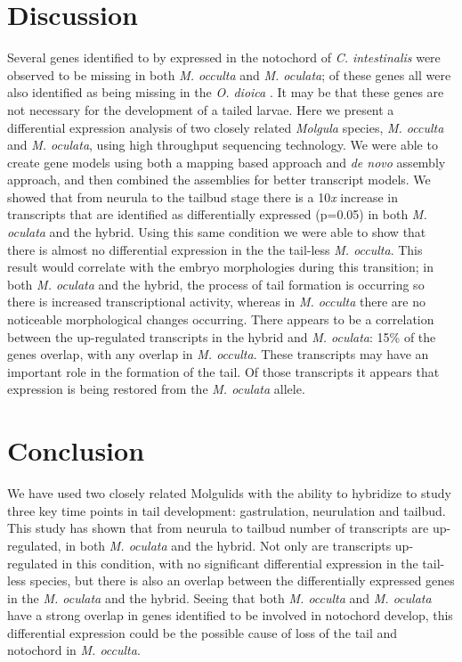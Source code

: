 \section{Discussion}
Several genes identified to by expressed in the notochord of \textit{C. intestinalis} \cite{hotta_characterization_2000,hotta_brachyury-downstream_2007} were observed to be missing in both \textit{M. occulta} and \textit{M. oculata}; of these genes all were also identified as being missing in the \textit{O. dioica} \cite{kugler_evolutionary_2011}. It may be that these genes are not necessary for the development of a tailed larvae.
Here we present a differential expression analysis of two closely related \textit{Molgula} species, \textit{M. occulta} and \textit{M. oculata}, using high throughput sequencing technology. We were able to create gene models using both a mapping based approach and \textit{de novo} assembly approach, and then combined the assemblies for better transcript models. We showed that from neurula to the tailbud stage there is a 10\textit{x} increase in transcripts that are identified as differentially expressed (p=0.05) in both \textit{M. oculata} and the hybrid. Using this same condition we were able to show that there is almost no differential expression in the the tail-less \textit{M. occulta}. This result would correlate with the embryo morphologies during this transition; in both  \textit{M. oculata} and the hybrid, the process of tail formation is occurring so there is increased transcriptional activity, whereas in \textit{M. occulta} there are no noticeable morphological changes occurring. There appears to be a correlation between the up-regulated transcripts in the hybrid and \textit{M. oculata}: 15\% of the genes overlap, with any overlap in \textit{M. occulta}. These transcripts may have an important role in the formation of the tail. Of those transcripts it appears that expression is being restored from the \textit{M. oculata} allele.

\section{Conclusion}

We have used two closely related Molgulids with the ability to hybridize to study three key time points in tail development: gastrulation, neurulation and tailbud. This study has shown that from neurula to tailbud number of transcripts are up-regulated, in both \textit{M. oculata} and the hybrid. Not only are transcripts up-regulated in this condition, with no significant differential expression in the tail-less species, but there is also an overlap between the differentially expressed genes in the \textit{M. oculata} and the hybrid. Seeing that both \textit{M. occulta} and \textit{M. oculata} have a strong overlap in genes identified to be involved in notochord develop, this differential expression could be the possible cause of loss of the tail and notochord in \textit{M. occulta}.
